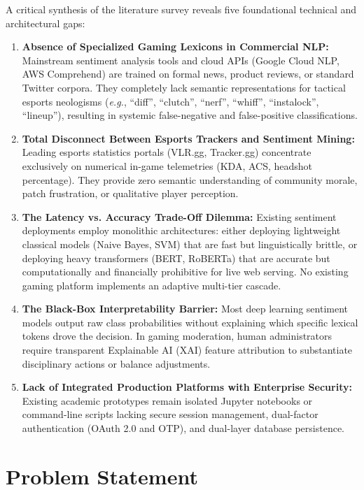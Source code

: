 A critical synthesis of the literature survey reveals five foundational technical and architectural gaps:
\begin{enumerate}
    \item \textbf{Absence of Specialized Gaming Lexicons in Commercial NLP:} Mainstream sentiment analysis tools and cloud APIs (Google Cloud NLP, AWS Comprehend) are trained on formal news, product reviews, or standard Twitter corpora. They completely lack semantic representations for tactical esports neologisms (\textit{e.g.}, ``diff'', ``clutch'', ``nerf'', ``whiff'', ``instalock'', ``lineup''), resulting in systemic false-negative and false-positive classifications.
    \item \textbf{Total Disconnect Between Esports Trackers and Sentiment Mining:} Leading esports statistics portals (VLR.gg, Tracker.gg) concentrate exclusively on numerical in-game telemetries (KDA, ACS, headshot percentage). They provide zero semantic understanding of community morale, patch frustration, or qualitative player perception.
    \item \textbf{The Latency vs. Accuracy Trade-Off Dilemma:} Existing sentiment deployments employ monolithic architectures: either deploying lightweight classical models (Naive Bayes, SVM) that are fast but linguistically brittle, or deploying heavy transformers (BERT, RoBERTa) that are accurate but computationally and financially prohibitive for live web serving. No existing gaming platform implements an adaptive multi-tier cascade.
    \item \textbf{The Black-Box Interpretability Barrier:} Most deep learning sentiment models output raw class probabilities without explaining which specific lexical tokens drove the decision. In gaming moderation, human administrators require transparent Explainable AI (XAI) feature attribution to substantiate disciplinary actions or balance adjustments.
    \item \textbf{Lack of Integrated Production Platforms with Enterprise Security:} Existing academic prototypes remain isolated Jupyter notebooks or command-line scripts lacking secure session management, dual-factor authentication (OAuth 2.0 and OTP), and dual-layer database persistence.
\end{enumerate}

\section{Problem Statement}
\label{sec:problem_statement}

